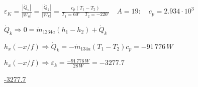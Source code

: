 

\item[d)] \(\varepsilon_K = \frac{|\dot{Q}_u|}{|W_u|} = \frac{|\dot{Q}_k|}{|W_k|} = \frac{c_p (T_1 - T_2)}{T_1 = 60^\circ \quad T_2 = -220^\circ} \quad A = 19: \quad c_p = 2.934 \cdot 10^3\)
    
    \(\dot{Q}_k \Rightarrow 0 = \dot{m}_{1234a} (h_1 - h_2) + \dot{Q}_k\)
    
    \(h_x (-x/f) \Rightarrow \dot{Q}_k = -\dot{m}_{134a} (T_1 - T_2) c_p = -91 \, 776 \, W\)
    
    \(h_x (-x/f) \Rightarrow \varepsilon_k = \frac{-91 \, 776 \, W}{28 \, W} = -3277.7\)
    
    \underline{-3277.7}